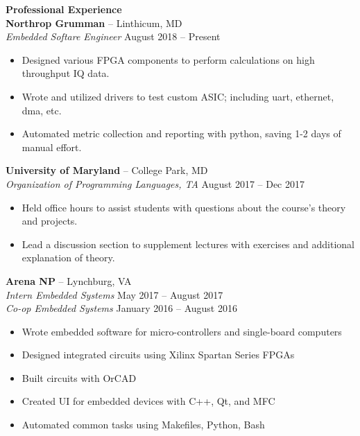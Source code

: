 \documentclass[10pt]{article}
\begin{document}
\begin{textblock}{0.7}
\begin{itemize}
      \end{itemize}
    \textbf{\large Professional Experience} \\
      \textbf{Northrop Grumman} -- Linthicum, MD \\
      \textit{Embedded Softare Engineer} \hfill August 2018 -- Present
      \begin{itemize}
        \setlength{\itemsep}{0pt}
        \item Designed various FPGA components to perform calculations on high throughput IQ data.
        \item Wrote and utilized drivers to test custom ASIC; including uart, ethernet, dma, etc.
        \item Automated metric collection and reporting with python, saving 1-2 days of manual effort.
      \end{itemize}
      \textbf{University of Maryland} -- College Park, MD \\
      \textit{Organization of Programming Languages, TA} \hfill August 2017 -- Dec 2017
      \begin{itemize}
        \setlength{\itemsep}{0pt}
        \item Held office hours to assist students with questions about the course's theory and projects.
        \item Lead a discussion section to supplement lectures with exercises and additional explanation of theory.
      \end{itemize}
      \textbf{Arena NP} -- Lynchburg, VA \\
      \textit{Intern Embedded Systems} \hfill May 2017 -- August 2017 \\
      \textit{Co-op Embedded Systems} \hfill January 2016 -- August 2016
      \begin{itemize}
        \setlength{\itemsep}{0pt}
        \item Wrote embedded software for micro-controllers and single-board computers
        \item Designed integrated circuits using Xilinx Spartan Series FPGAs
        \item Built circuits with OrCAD
        \item Created UI for embedded devices with C++, Qt, and MFC
        \item Automated common tasks using Makefiles, Python, Bash
      \end{itemize}
  \end{textblock}
\end{document}
